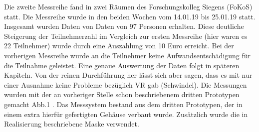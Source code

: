 

Die zweite Messreihe fand in zwei Räumen des Forschungskolleg Siegens (FoKoS) statt. 
Die Messreihe wurde in den beiden Wochen vom  14.01.19 bis 25.01.19 statt. 
Insgesamt wurden Daten von Daten von 97 Personen erhalten. 
Diese deutliche Steigerung der Teilnehmerzahl im Vergleich zur ersten Messreihe (hier waren es 22 Teilnehmer) wurde durch eine Auszahlung von 10 Euro erreicht. 
Bei der vorherigen Messreihe wurde an die Teilnehmer keine Aufwandsentschädigung für die Teilnahme geleistet. 
Eine genaue Auswertung der Daten folgt in späteren Kapiteln. Von der reinen Durchführung her lässt sich aber sagen, dass es mit nur einer Ausnahme keine Probleme bezüglich VR gab (Schwindel).
Die Messungen wurden mit der an vorheriger Stelle schon beschriebenem dritten Prototypen gemacht Abb.1 . Das Messsystem bestand aus dem dritten Prototypen, der in einem extra hierfür gefertigten Gehäuse verbaut wurde. Zusätzlich wurde die in Realisierung beschriebene Maske verwendet. 